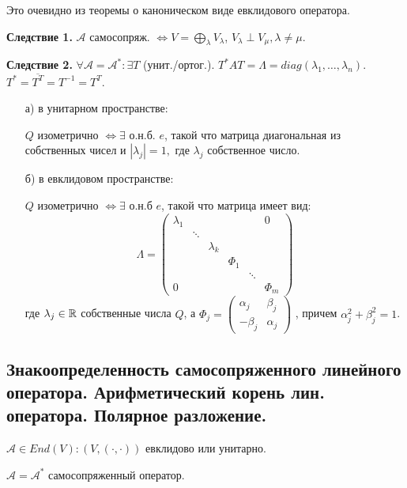 Это очевидно из теоремы о каноническом виде евклидового оператора.

\textbf{Следствие 1.} $\mathcal{A}$ самосопряж. $\Leftrightarrow V=\bigoplus\limits_{\lambda}V_\lambda$, $V_\lambda \perp V_\mu, \lambda \neq \mu$.

\textbf{Следствие 2.} $\forall \mathcal{A} = \mathcal{A}^*: \exists T$ (унит./ортог.). $T^* AT = \Lambda = diag(\lambda_1,\ldots, \lambda_n)$. $T^*= \overline{T^T}=T^{-1}=T^T$.


\begin{enumerate}
    \item[а)] в унитарном пространстве:

    $Q$ изометрично $\Leftrightarrow \exists$ о.н.б. $e$, такой что матрица диагональная из собственных чисел и $|\lambda_j|=1,$ где $\lambda_j$ собственное число.

      \item[б)] в евклидовом пространстве:

      $Q$ изометрично $\Leftrightarrow \exists$ о.н.б $e$, такой что матрица имеет вид:
      $$\Lambda = \begin{pmatrix}
    \lambda_1 & & & & &0\\
    & \ddots & & & &\\
    & & \lambda_k & & &\\
    & & & \Phi_1 & &\\
    & & & & \ddots & \\
    0& & & & & \Phi_m
\end{pmatrix}$$
где $\lambda_j \in \mathbb{R}$ собственные числа $Q$, а $\Phi_j = \begin{pmatrix}
    \alpha_j & \beta_j\\
    -\beta_j &\alpha_j
\end{pmatrix}$
, причем $\alpha_j^2 + \beta_j^2 = 1$.

\end{enumerate}

\pagebreak
\subsection{Знакоопределенность самосопряженного линейного оператора. Арифметический корень лин. оператора. Полярное разложение.}

 $\mathcal{A} \in End(V): (V, (\cdot,\cdot))$ евклидово или унитарно.

$\mathcal{A} = \mathcal{A}^*$ самосопряженный оператор.

